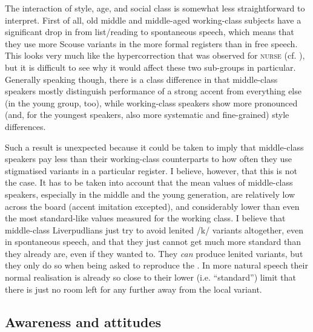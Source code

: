 The interaction of style, age, and social class is somewhat less straightforward to interpret.
First of all, old middle and middle-aged working-class subjects have a significant drop in  from list/reading to spontaneous speech, which means that they use more Scouse variants in the more formal registers than in free speech.
This looks very much like the hypercorrection that was observed for \textsc{nurse} (cf. ), but it is difficult to see why it would affect these two sub-groups in particular.
Generally speaking though, there is a class difference in that middle-class speakers mostly distinguish performance of a strong accent from everything else (in the young group, too), while working-class speakers show more pronounced (and, for the youngest speakers, also more systematic and fine-grained) style differences.

Such a result is unexpected because it could be taken to imply that middle-class speakers pay less  than their working-class counterparts to how often they use stigmatised variants in a particular register.
I believe, however, that this is not the case.
It has to be taken into account that the mean  values of middle-class speakers, especially in the middle and the young generation, are relatively low across the board (accent imitation excepted), and considerably lower than even the most standard-like values measured for the working class.
I believe that middle-class Liverpudlians just try to avoid lenited /k/ variants altogether, even in spontaneous speech, and that they just cannot get much more standard than they already are, even if they wanted to.
They \emph{can} produce lenited variants, but they only do so when being asked to reproduce the .
In more natural speech their normal realisation is already so close to their lower (i.e. ``standard'') limit that there is just no room left for any further  away from the local variant.

\subsection{Awareness and attitudes}
\label{prod.disc.k.aware}

